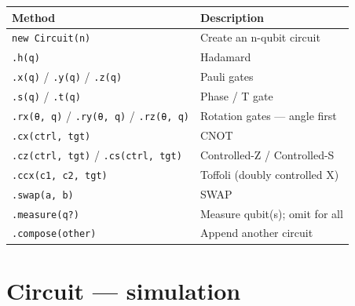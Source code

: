 \documentclass[
  11pt,
  letterpaper,
  oneside]{scrbook}
\begin{document}
\begin{longtable}[]{@{}
  >{\raggedright\arraybackslash}p{}
  >{\raggedright\arraybackslash}p{}@{}}
\toprule\noalign{}
\begin{minipage}[b]{\linewidth}\raggedright
Method
\end{minipage} & \begin{minipage}[b]{\linewidth}\raggedright
Description
\end{minipage} \\
\midrule\noalign{}
\endhead
\bottomrule\noalign{}
\endlastfoot
\texttt{new\ Circuit(n)} & Create an n-qubit circuit \\
\texttt{.h(q)} & Hadamard \\
\texttt{.x(q)} / \texttt{.y(q)} / \texttt{.z(q)} & Pauli gates \\
\texttt{.s(q)} / \texttt{.t(q)} & Phase / T gate \\
\texttt{.rx(θ,\ q)} / \texttt{.ry(θ,\ q)} / \texttt{.rz(θ,\ q)} &
Rotation gates --- angle first \\
\texttt{.cx(ctrl,\ tgt)} & CNOT \\
\texttt{.cz(ctrl,\ tgt)} / \texttt{.cs(ctrl,\ tgt)} & Controlled-Z /
Controlled-S \\
\texttt{.ccx(c1,\ c2,\ tgt)} & Toffoli (doubly controlled X) \\
\texttt{.swap(a,\ b)} & SWAP \\
\texttt{.measure(q?)} & Measure qubit(s); omit for all \\
\texttt{.compose(other)} & Append another circuit \\
\end{longtable}

\section*{Circuit --- simulation}\label{circuit-simulation}

\end{document}
